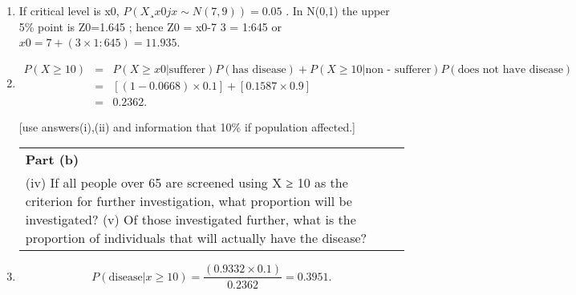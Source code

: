 \documentclass[a4paper,12pt]{article}
\begin{document}
\begin{enumerate}
\begin{table}[ht!]
\begin{tabular}{|p{15cm}|}
\\ \hline
 \end{tabular}
\end{table}
\item If critical level is x0, $P(X¸x0jx \sim N(7,9))=0.05$ .
In N(0,1) the upper 5\% point is Z0=1.645 ; hence Z0 = x0-7
3 = 1:645 or $x0 = 7+(3\times1:645) =
11.935$.
\item 

\begin{eqnarray*}
P(X\geq 10) &=& 
P(X \geq x0|\mbox{sufferer})P(\mbox{has disease}) + P(X \geq 10|\mbox{non - sufferer})P(\mbox{does not have disease})\\
&=& \left[(1 - 0.0668) \times 0.1\right] + \left[0.1587 \times 0.9\right]\\
&=& 0.2362.
\end{eqnarray*}

[use answers(i),(ii) and information that 10\% if population affected.]


\begin{table}[ht!]
     \centering
     \begin{tabular}{|p{15cm}|}
     \hline        
 \noindent \textbf{Part (b)}\\
\noindent (iv) If all people over 65 are screened using X ≥ 10 as the criterion for further investigation, what proportion will be investigated?
(v) Of those investigated further, what is the proportion of individuals that will actually have the disease?

\\ \hline
 \end{tabular}
\end{table}

\item \[P(\mbox{disease}|x \geq 10)=\frac{(0.9332\times0.1)}{0.2362}=0.3951 .\]
\end{enumerate}
\end{document}
